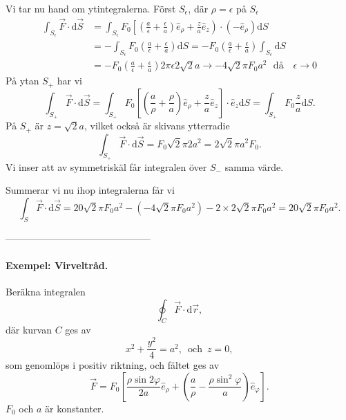 \documentclass[%
oneside,                 %
final,                   %
10pt]{article}
\begin{document}
Vi tar nu hand om ytintegralerna.  Först $S_\epsilon$, där $\rho = \epsilon$ på $S_\epsilon$
\begin{align}
  \int_{S_\epsilon} \vec{F} \cdot \mbox{d}\vec{S} &= \int_{S_\epsilon}  F_0 \left[
\left(\frac{a}{\epsilon} + \frac{\epsilon}{a}\right) \hat{e}_{\rho} + 
\frac{z}{a}\hat{e}_{z}\right) \cdot \left(-\hat{e}_{\rho}\right) \mbox{d}S \nonumber \\
& = -\int_{S_\epsilon} F_0 \left(\frac{a}{\epsilon} + \frac{\epsilon}{a}\right)
\mbox{d}S = -F_0 \left(\frac{a}{\epsilon} + \frac{\epsilon}{a}\right)
\int_{S_\epsilon} \mbox{d}S \nonumber \\
&= -F_0 \left(\frac{a}{\epsilon} + \frac{\epsilon}{a}\right) 2\pi \epsilon 2\sqrt{2}
a \to - 4\sqrt{2} \pi F_0 a^2 \,\,\,\,\mbox{då }\,\,\,\,\epsilon \to 0
\end{align}
På ytan $S_+$  har vi
\begin{equation}
  \int_{S_+} \vec{F} \cdot \mbox{d}\vec{S} = \int_{S_+} F_0 \left[\left(\frac{a}{\rho}
+ \frac{\rho}{a} \right) \hat{e}_{\rho} + \frac{z}{a}\hat{e}_{z}\right]
\cdot \hat{e}_{z} \mbox{d}S = \int_{S_+} F_0 \frac{z}{a} \mbox{d}S.
\end{equation}
På $S_+$ är $z = \sqrt{2}a$, vilket också är skivans ytterradie
\begin{equation}
  \int_{S_+} \vec{F} \cdot \mbox{d}\vec{S} = F_0 \sqrt{2} \pi 2a^2 = 2\sqrt{2} \pi a^2F_0.\end{equation}
Vi inser att av symmetriskäl får integralen över $S_-$ samma värde.

Summerar vi nu ihop integralerna får vi
\begin{equation}
  \int_S \vec{F} \cdot \mbox{d}\vec{S} = 20 \sqrt{2} \pi F_0 a^2 - ( - 4 \sqrt{2} \pi F_0 a^2)
- 2 \times 2 \sqrt{2} \pi F_0 a^2 = 20 \sqrt{2} \pi F_0 a^2.
\end{equation}

---------------------------------------------

\paragraph{Exempel: Virveltråd.}


\vspace{3mm}


Beräkna integralen
\begin{equation}
  \oint_C \vec{F} \cdot \mbox{d}\vec{r},
\end{equation}
där kurvan $C$ ges av 
\begin{equation}
  x^2 + \frac{y^2}{4} = a^2,\,\,\,\mbox{och}\,\,\,z = 0,
\end{equation}
som genomlöps i positiv riktning, och fältet ges av
\begin{equation}
  \vec{F} = F_0 \left[\frac{\rho \sin 2\varphi}{2a} \hat{e}_{\rho}
+ \left(\frac{a}{\rho} - \frac{\rho \sin^2 \varphi}{a}\right)\hat{e}_{\varphi}
\right].
\end{equation}
$F_0$ och $a$ är konstanter.
\end{document}
